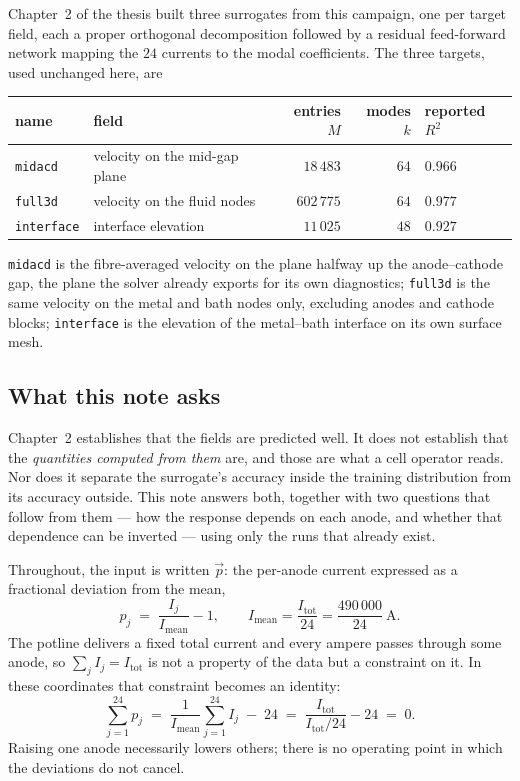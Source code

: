\documentclass[11pt,a4paper]{article}
\theoremstyle{plain}
\theoremstyle{definition}
\theoremstyle{remark}
\begin{document}
Chapter~2 of the thesis built three surrogates from this campaign, one per
target field, each a proper orthogonal decomposition followed by a residual
feed-forward network mapping the $24$ currents to the modal coefficients. The
three targets, used unchanged here, are

\begin{center}
\small
\begin{tabular}{@{}llrrl@{}}
\toprule
name & field & entries $M$ & modes $k$ & reported $R^2$ \\
\midrule
\texttt{midacd}    & velocity on the mid-gap plane & $18\,483$  & $64$ & $0.966$ \\
\texttt{full3d}    & velocity on the fluid nodes   & $602\,775$ & $64$ & $0.977$ \\
\texttt{interface} & interface elevation           & $11\,025$  & $48$ & $0.927$ \\
\bottomrule
\end{tabular}
\end{center}

\noindent
\texttt{midacd} is the fibre-averaged velocity on the plane halfway up the
anode--cathode gap, the plane the solver already exports for its own
diagnostics; \texttt{full3d} is the same velocity on the metal and bath nodes
only, excluding anodes and cathode blocks; \texttt{interface} is the elevation
of the metal--bath interface on its own surface mesh.

\subsection{What this note asks}
\label{auto:what-this-note-asks}

Chapter~2 establishes that the fields are predicted well. It does not establish
that the \emph{quantities computed from them} are, and those are what a cell
operator reads. Nor does it separate the surrogate's accuracy inside the
training distribution from its accuracy outside. This note answers both, together
with two questions that follow from them --- how the response depends on each
anode, and whether that dependence can be inverted --- using only the runs that
already exist.

Throughout, the input is written $\vec{p}$: the per-anode current expressed as a
fractional deviation from the mean,
\[
  p_j \;=\; \frac{I_j}{I_{\mathrm{mean}}} - 1,
  \qquad I_{\mathrm{mean}} = \frac{I_{\mathrm{tot}}}{24} = \frac{490\,000}{24}\ \mathrm{A}.
\]
The potline delivers a fixed total current and every ampere passes through some
anode, so $\sum_j I_j = I_{\mathrm{tot}}$ is not a property of the data but a
constraint on it. In these coordinates that constraint becomes an identity:
\begin{equation}
\label{eq:sumzero}
  \sum_{j=1}^{24} p_j
  \;=\; \frac{1}{I_{\mathrm{mean}}}\sum_{j=1}^{24} I_j \;-\; 24
  \;=\; \frac{I_{\mathrm{tot}}}{I_{\mathrm{tot}}/24} - 24
  \;=\; 0 .
\end{equation}
Raising one anode necessarily lowers others; there is no operating point in
which the deviations do not cancel.
\end{document}
